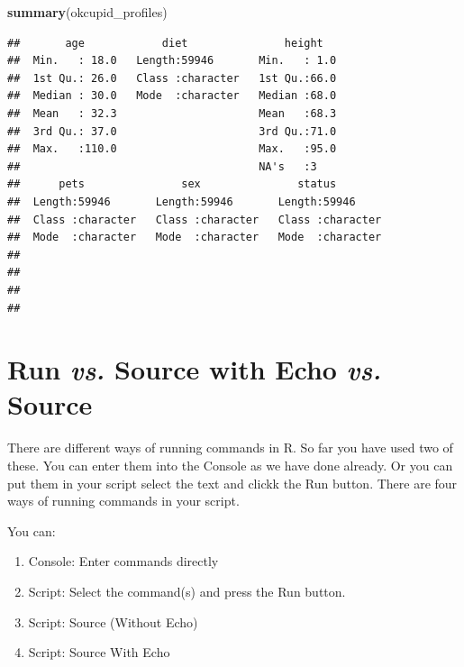 \documentclass[
]{krantz}
\makeatletter
\newenvironment{Shaded}{\begin{snugshade}}{\end{snugshade}}
\newcommand{\KeywordTok}[1]{\textcolor[rgb]{0.27,0.27,0.27}{\textbf{#1}}}
\newcommand{\NormalTok}[1]{#1}
\providecommand{\tightlist}{%
  \setlength{\itemsep}{0pt}\setlength{\parskip}{0pt}}
\newenvironment{kframe}{%
\medskip{}
\setlength{\fboxsep}{.8em}
 \def\at@end@of@kframe{}%
 \ifinner\ifhmode%
  \def\at@end@of@kframe{\end{minipage}}%
  \begin{minipage}{\columnwidth}%
 \fi\fi%
 \def\FrameCommand##1{\hskip\@totalleftmargin \hskip-\fboxsep
 \colorbox{shadecolor}{##1}\hskip-\fboxsep
     \hskip-\linewidth \hskip-\@totalleftmargin \hskip\columnwidth}%
 \MakeFramed {\advance\hsize-\width
   \@totalleftmargin\z@ \linewidth\hsize
   \@setminipage}}%
 {\par\unskip\endMakeFramed%
 \at@end@of@kframe}
\renewenvironment{Shaded}{\begin{kframe}}{\end{kframe}}
\makeatother
\begin{document}
\begin{Shaded}
\begin{Highlighting}[]
\KeywordTok{summary}\NormalTok{(okcupid_profiles)}
\end{Highlighting}
\end{Shaded}

\begin{verbatim}
##       age            diet               height    
##  Min.   : 18.0   Length:59946       Min.   : 1.0  
##  1st Qu.: 26.0   Class :character   1st Qu.:66.0  
##  Median : 30.0   Mode  :character   Median :68.0  
##  Mean   : 32.3                      Mean   :68.3  
##  3rd Qu.: 37.0                      3rd Qu.:71.0  
##  Max.   :110.0                      Max.   :95.0  
##                                     NA's   :3     
##      pets               sex               status         
##  Length:59946       Length:59946       Length:59946      
##  Class :character   Class :character   Class :character  
##  Mode  :character   Mode  :character   Mode  :character  
##                                                          
##                                                          
##                                                          
## 
\end{verbatim}

\hypertarget{run-vs.-source-with-echo-vs.-source}{%
\section{\texorpdfstring{Run \emph{vs.} Source with Echo \emph{vs.} Source}{Run vs. Source with Echo vs. Source}}\label{run-vs.-source-with-echo-vs.-source}}

There are different ways of running commands in R. So far you have used two of these. You can enter them into the Console as we have done already. Or you can put them in your script select the text and clickk the Run button. There are four ways of running commands in your script.

You can:

\begin{enumerate}
\def\labelenumi{\arabic{enumi}.}
\tightlist
\item
  Console: Enter commands directly
\item
  Script: Select the command(s) and press the Run button.
\item
  Script: Source (Without Echo)
\item
  Script: Source With Echo
\end{enumerate}
\end{document}
